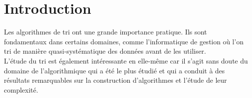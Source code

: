 \chapter{Introduction}
Les algorithmes de tri ont une grande importance pratique. Ils sont fondamentaux dans certains domaines, comme l'informatique de gestion où l'on tri de manière quasi-systématique des données avant de les utiliser.
\\
L'étude du tri est également intéressante en elle-même car il s'agit sans doute du domaine de l'algorithmique qui a été le plus étudié et qui a conduit à des résultats remarquables sur la construction d'algorithmes et l'étude de leur complexité.